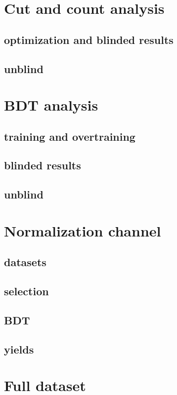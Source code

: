 \documentclass[10pt,a4paper]{article}
\begin{document}



\clearpage
\section{Cut and count analysis}
\subsection{optimization and blinded results}
\subsection{unblind}

\section{BDT analysis}
\subsection{training and overtraining}
\subsection{blinded results}
\subsection{unblind}

\section{Normalization channel}
\subsection{datasets}
\subsection{selection}
\subsection{BDT}
\subsection{yields}

\cleardoublepage{}

\section{Full dataset}
\end{document}
